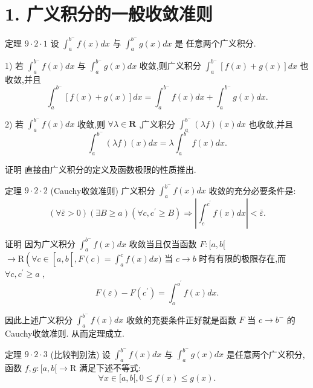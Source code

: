\section*{1. 广义积分的一般收敛准则}

定理 $9 \cdot  2 \cdot  1$ 设 ${\int }_{a}^{{b}^{ - }}f\left( x\right) {dx}$ 与 ${\int }_{a}^{{b}^{ - }}g\left( x\right) {dx}$ 是 任意两个广义积分.

1) 若 ${\int }_{a}^{{b}^{ - }}f\left( x\right) {dx}$ 与 ${\int }_{a}^{{b}^{ - }}g\left( x\right) {dx}$ 收敛,则广义积分 ${\int }_{a}^{{b}^{ - }}\left\lbrack  {f\left( x\right)  + g\left( x\right) }\right\rbrack  {dx}$ 也收敛,并且
$${\int }_{a}^{{b}^{ - }}\left\lbrack  {f\left( x\right)  + g\left( x\right) }\right\rbrack  {dx} = {\int }_{a}^{{b}^{ - }}f\left( x\right) {dx} + {\int }_{a}^{{b}^{ - }}g\left( x\right) {dx}.$$

2) 若 ${\int }_{a}^{{b}^{ - }}f\left( x\right) {dx}$ 收敛,则 $\forall \lambda  \in  \mathbf{R}$ ,广义积分 ${\int }_{a}^{{b}^{ - }}\left( {\lambda f}\right) \left( x\right) {dx}$ 也收敛,并且
$${\int }_{a}^{{b}^{ - }}\left( {\lambda f}\right) \left( x\right) {dx} = \lambda {\int }_{a}^{{b}^{ - }}f\left( x\right) {dx}.$$

证明 直接由广义积分的定义及函数极限的性质推出.

定理 $9 \cdot  2 \cdot  2$ (Cauchy收敛准则) 广义积分 ${\int }_{a}^{{b}^{ - }}f\left( x\right) {dx}$ 收敛的充分必要条件是:
$$\left( {\forall \bar{\varepsilon } > 0}\right) \left( {\exists B \geq  a}\right) \left( {\forall c,{c}^{\prime } \geq  B}\right)  \Rightarrow  \left| {{\int }_{c}^{{c}^{\prime }}f\left( x\right) {dx}}\right|  < \bar{\varepsilon }.$$

证明 因为广义积分 ${\int }_{a}^{{b}^{ - }}f\left( x\right) {dx}$ 收敛当且仅当函数 $F : \lbrack a,b\lbrack$  $\rightarrow  \mathrm{R}\left( {\forall c \in  \left\lbrack  {a,b\left\lbrack  \right. ,F\left( c\right)  = {\int }_{a}^{c}f\left( x\right) {dx})}\right. }\right.$ 当 $c \rightarrow  b$ 时有有限的极限存在,而 $\forall c,{c}^{\prime } \geq  a$ ,
$$F\left( \varepsilon \right)  - F\left( {c}^{\prime }\right)  = {\int }_{o}^{{o}^{\prime }}f\left( x\right) {dx}.$$

因此上述广义积分 ${\int }_{a}^{{b}^{ - }}f\left( x\right) {dx}$ 收敛的充要条件正好就是函数 $F$ 当 $c \rightarrow  {b}^{ - }$ 的Cauchy收敛准则. 从而定理成立.

定理 $9 \cdot  2 \cdot  3$ (比较判别法) 设 ${\int }_{a}^{{b}^{ - }}f\left( x\right) {dx}$ 与 ${\int }_{a}^{{b}^{ - }}g\left( x\right) {dx}$ 是任意两个广义积分,函数 $f,g : \lbrack a,b\lbrack  \rightarrow  \mathrm{R}$ 满足下述不等式:
$$\forall x \in  \lbrack a,b\lbrack ,0 \leq  f\left( x\right)  \leq  g\left( x\right) .$$

